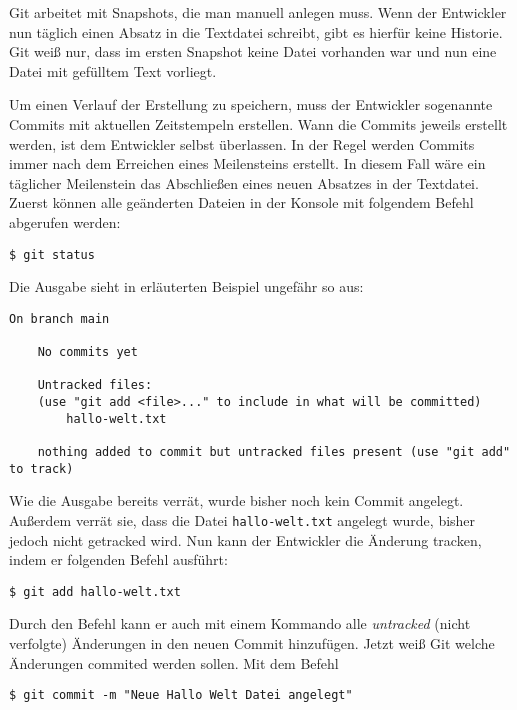 Git arbeitet mit Snapshots, die man manuell anlegen muss. Wenn der Entwickler
nun täglich einen Absatz in die Textdatei schreibt, gibt es hierfür keine
Historie. Git weiß nur, dass im ersten Snapshot keine Datei vorhanden war und
nun eine Datei mit gefülltem Text vorliegt.

Um einen Verlauf der Erstellung zu speichern, muss der Entwickler sogenannte
Commits mit aktuellen Zeitstempeln erstellen. Wann die Commits jeweils erstellt
werden, ist dem Entwickler selbst überlassen. In der Regel werden Commits immer
nach dem Erreichen eines Meilensteins erstellt. In diesem Fall wäre ein
täglicher Meilenstein das Abschließen eines neuen Absatzes in der Textdatei.
Zuerst können alle geänderten Dateien in der Konsole mit folgendem Befehl
abgerufen werden:

\begin{lstlisting}[style=Bash]
    $ git status
\end{lstlisting}

Die Ausgabe sieht in erläuterten Beispiel ungefähr so aus:

\begin{lstlisting}[style=Bash]
    On branch main

    No commits yet

    Untracked files:
    (use "git add <file>..." to include in what will be committed)
        hallo-welt.txt

    nothing added to commit but untracked files present (use "git add" to track)
\end{lstlisting}

Wie die Ausgabe bereits verrät, wurde bisher noch kein Commit angelegt. Außerdem
verrät sie, dass die Datei \texttt{hallo-welt.txt} angelegt wurde, bisher jedoch
nicht getracked wird. Nun kann der Entwickler die Änderung tracken, indem er
folgenden Befehl ausführt:

\begin{lstlisting}[style=Bash]
    $ git add hallo-welt.txt
\end{lstlisting}

Durch den Befehl  kann er auch mit einem Kommando alle
\emph{untracked} (nicht verfolgte) Änderungen in den neuen Commit hinzufügen.
Jetzt weiß Git welche Änderungen commited werden sollen. Mit dem Befehl

\begin{lstlisting}[style=Bash]
    $ git commit -m "Neue Hallo Welt Datei angelegt"
\end{lstlisting}

